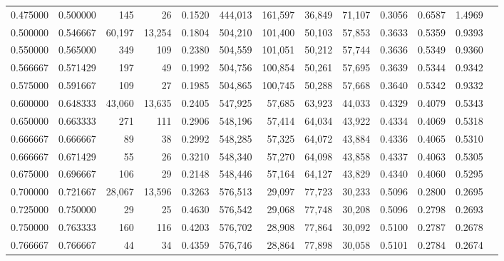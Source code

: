 \begin{tabular}{rrrrrrrrrrrrr}
0.475000 & 0.500000 &    145 &     26 &                                     0.1520 & 444,013 & 161,597 &  36,849 &  71,107 & 0.3056 & 0.6587 & 1.4969 \\
0.500000 & 0.546667 & 60,197 & 13,254 &                                     0.1804 & 504,210 & 101,400 &  50,103 &  57,853 & 0.3633 & 0.5359 & 0.9393 \\
0.550000 & 0.565000 &    349 &    109 &                                     0.2380 & 504,559 & 101,051 &  50,212 &  57,744 & 0.3636 & 0.5349 & 0.9360 \\
0.566667 & 0.571429 &    197 &     49 &                                     0.1992 & 504,756 & 100,854 &  50,261 &  57,695 & 0.3639 & 0.5344 & 0.9342 \\
0.575000 & 0.591667 &    109 &     27 &                                     0.1985 & 504,865 & 100,745 &  50,288 &  57,668 & 0.3640 & 0.5342 & 0.9332 \\
0.600000 & 0.648333 & 43,060 & 13,635 &                                     0.2405 & 547,925 &  57,685 &  63,923 &  44,033 & 0.4329 & 0.4079 & 0.5343 \\
0.650000 & 0.663333 &    271 &    111 &                                     0.2906 & 548,196 &  57,414 &  64,034 &  43,922 & 0.4334 & 0.4069 & 0.5318 \\
0.666667 & 0.666667 &     89 &     38 &                                     0.2992 & 548,285 &  57,325 &  64,072 &  43,884 & 0.4336 & 0.4065 & 0.5310 \\
0.666667 & 0.671429 &     55 &     26 &                                     0.3210 & 548,340 &  57,270 &  64,098 &  43,858 & 0.4337 & 0.4063 & 0.5305 \\
0.675000 & 0.696667 &    106 &     29 &                                     0.2148 & 548,446 &  57,164 &  64,127 &  43,829 & 0.4340 & 0.4060 & 0.5295 \\
0.700000 & 0.721667 & 28,067 & 13,596 &                                     0.3263 & 576,513 &  29,097 &  77,723 &  30,233 & 0.5096 & 0.2800 & 0.2695 \\
0.725000 & 0.750000 &     29 &     25 &                                     0.4630 & 576,542 &  29,068 &  77,748 &  30,208 & 0.5096 & 0.2798 & 0.2693 \\
0.750000 & 0.763333 &    160 &    116 &                                     0.4203 & 576,702 &  28,908 &  77,864 &  30,092 & 0.5100 & 0.2787 & 0.2678 \\
0.766667 & 0.766667 &     44 &     34 &                                     0.4359 & 576,746 &  28,864 &  77,898 &  30,058 & 0.5101 & 0.2784 & 0.2674 \\

\end{tabular}

